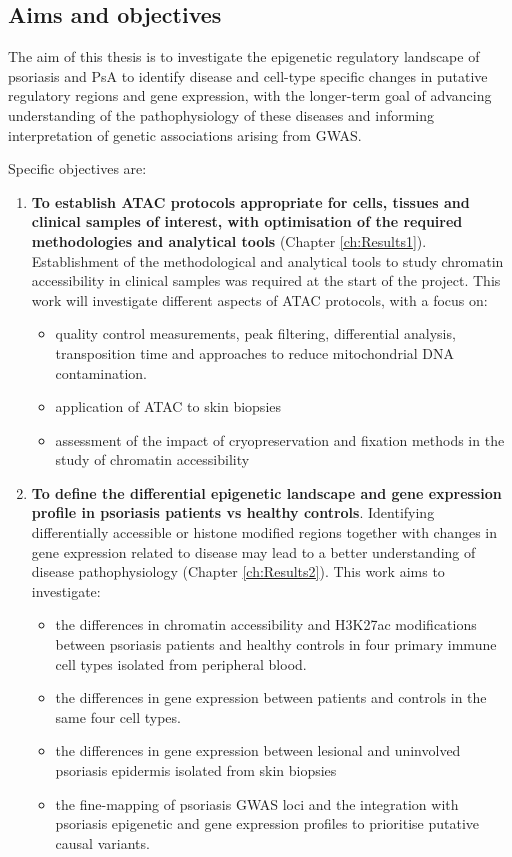 \subsection{Aims and objectives}

The aim of this thesis is to investigate the epigenetic regulatory landscape of psoriasis and PsA to identify disease and cell-type specific changes in putative regulatory regions and gene expression, with the longer-term goal of advancing understanding of the pathophysiology of these diseases and informing interpretation of genetic associations arising from GWAS. 

Specific objectives are:
\begin{enumerate}

\item \textbf{To establish ATAC protocols appropriate for cells, tissues and clinical samples of interest, with optimisation of the required methodologies and analytical tools} (Chapter \ref{ch:Results1}). Establishment of the methodological and analytical tools to study chromatin accessibility in clinical samples was required at the start of the project. This work will investigate different aspects of ATAC protocols, with a focus on: 
\begin{itemize}
	\item quality control measurements, peak filtering, differential analysis, transposition time and approaches to reduce mitochondrial DNA contamination.
	\item application of ATAC to skin biopsies
	\item assessment of the impact of cryopreservation and fixation methods in the study of chromatin accessibility
	\end{itemize}

\item \textbf{To define the differential epigenetic landscape and gene expression profile in psoriasis patients vs healthy controls}. Identifying differentially accessible or histone modified regions together with changes in gene expression related to disease may lead to a better understanding of disease pathophysiology (Chapter \ref{ch:Results2}).  This work aims to investigate:

\begin{itemize}
	\item the differences in chromatin accessibility and H3K27ac modifications between psoriasis patients and healthy controls in four primary immune cell types isolated from peripheral blood.
	\item the differences in gene expression between patients and controls in the same four cell types.
	\item the differences in gene expression between lesional and uninvolved psoriasis epidermis isolated from skin biopsies
	\item the fine-mapping of psoriasis GWAS loci and the integration with psoriasis epigenetic and gene expression profiles to prioritise putative causal variants.
\end{itemize}


\end{enumerate}
